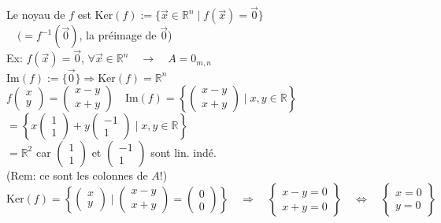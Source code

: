 \documentclass{article}
\begin{document}
Le noyau de $f$ est $\mathrm{Ker}(f) := \{ \vec{x} \in \mathbb{R}^n \mid f(\vec{x}) = \vec{0} \}$ \\
$ \quad (= f^{-1}(\vec{0})$, la préimage de $\vec{0}$) \\
Ex: $f(\vec{x}) = \vec{0}$, $\forall \vec{x} \in \mathbb{R}^n \quad \rightarrow \quad A = 0_{m,n}$ \\

$\mathrm{Im}(f) := \{ \vec{0} \} \Rightarrow \mathrm{Ker}(f) = \mathbb{R}^n$ \\

$\displaystyle f\begin{pmatrix} x \\ y \end{pmatrix} = \begin{pmatrix} x - y \\ x + y \end{pmatrix} \quad \mathrm{Im}(f) = \left\{ \begin{pmatrix} x - y \\ x + y \end{pmatrix} \mid x,y \in \mathbb{R} \right\}$ \\

$= \left\{ x \begin{pmatrix} 1 \\ 1 \end{pmatrix} + y \begin{pmatrix} -1 \\ 1 \end{pmatrix} \mid x,y \in \mathbb{R} \right\}$ \\

$= \mathbb{R}^2$ car $\begin{pmatrix} 1 \\ 1 \end{pmatrix}$ et $\begin{pmatrix} -1 \\ 1 \end{pmatrix}$ sont lin. indé. \\

(Rem: ce sont les colonnes de $A$!) \\

$\mathrm{Ker}(f) = \left\{ \begin{pmatrix} x \\ y \end{pmatrix} \mid \begin{pmatrix} x - y \\ x + y \end{pmatrix} = \begin{pmatrix} 0 \\ 0 \end{pmatrix} \right\} \quad \Rightarrow \quad \left\{ \begin{array}{l} x - y = 0 \\ x + y = 0 \end{array} \right\} \quad \Leftrightarrow \quad \left\{ \begin{array}{l} x = 0 \\ y = 0 \end{array} \right\}$ \\
\end{document}
